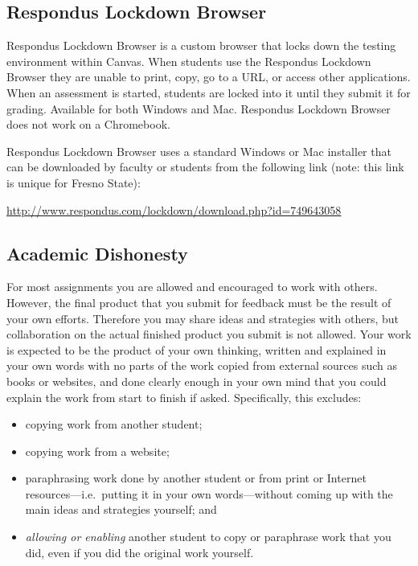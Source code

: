 \hypertarget{respondus-lockdown-browser}{%
\subsection{Respondus Lockdown
Browser}\label{respondus-lockdown-browser}}

Respondus Lockdown Browser is a custom browser that locks down the
testing environment within Canvas. When students use the Respondus
Lockdown Browser they are unable to print, copy, go to a URL, or access
other applications. When an assessment is started, students are locked
into it until they submit it for grading. Available for both Windows and
Mac. Respondus Lockdown Browser does not work on a Chromebook.

Respondus Lockdown Browser uses a standard Windows or Mac installer that
can be downloaded by faculty or students from the following link (note:
this link is unique for Fresno State):

\url{http://www.respondus.com/lockdown/download.php?id=749643058}

\hypertarget{academic-dishonesty}{%
\subsection{Academic Dishonesty}\label{academic-dishonesty}}

For most assignments you are allowed and encouraged to work with others.
However, the final product that you submit for feedback must be the
result of your own efforts. Therefore you may share ideas and strategies
with others, but collaboration on the actual finished product you submit
is not allowed. Your work is expected to be the product of your own
thinking, written and explained in your own words with no parts of the
work copied from external sources such as books or websites, and done
clearly enough in your own mind that you could explain the work from
start to finish if asked. Specifically, this excludes:

\begin{itemize}
\tightlist
\item
  copying work from another student;
\item
  copying work from a website;
\item
  paraphrasing work done by another student or from print or Internet
  resources---i.e.~putting it in your own words---without coming up with
  the main ideas and strategies yourself; and
\item
  \emph{allowing or enabling} another student to copy or paraphrase work
  that you did, even if you did the original work yourself.
\end{itemize}

